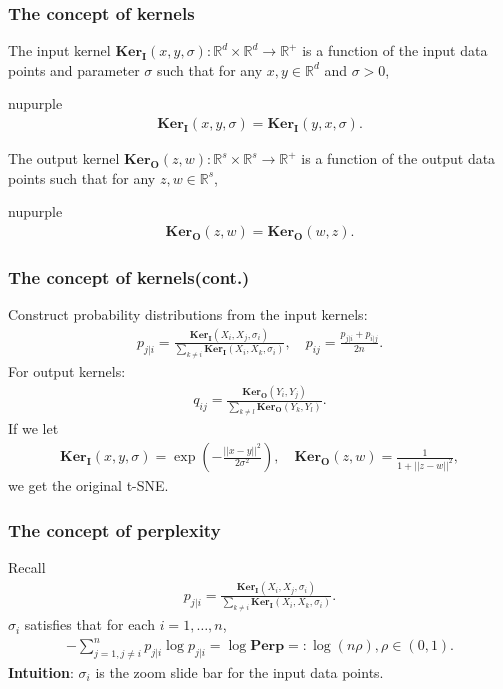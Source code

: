 \documentclass{beamer}
\newcommand{\ki}{\mathbf{Ker}_{\mathbf{I}}}
\newcommand{\ko}{\mathbf{Ker}_{\mathbf{O}}}
\begin{document}
\begin{frame}
  \frametitle{The concept of kernels}
  \begin{definition}  \label{def:input_kernel}
    The input kernel $\ki(x,y,\sigma): \mathbb{R}^d  \times \mathbb{R}^d \to \mathbb{R}^+$ is a function of the input data points and parameter $\sigma$ such that for any $x,y \in \mathbb{R}^d$ and $\sigma > 0$,
    \begin{color}{nupurple}
      \begin{align}
        \ki(x,y,\sigma)=\ki(y,x,\sigma).
      \end{align}
    \end{color}
  \end{definition}
  \begin{definition}  \label{def:output_kernel}
    The output kernel $\ko(z,w):\mathbb{R}^s \times \mathbb{R}^s \to \mathbb{R}^+$ is a function of the output data points such that for any $z,w \in \mathbb{R}^s$,
    \begin{color}{nupurple}
      \begin{align}
        \ko(z,w)=\ko(w,z).
      \end{align}
    \end{color}
  \end{definition}
\end{frame}

\begin{frame}
  \frametitle{The concept of kernels(cont.)}
  Construct probability distributions from the input kernels:
  \begin{align}
    p_{j|i} = \frac{\ki(X_i,X_j,\sigma_i)}{\sum_{k \neq i} \ki(X_i,X_k,\sigma_i)}, \quad p_{ij} = \frac{p_{j|i} + p_{i|j}}{2n}.
  \end{align}
  For output kernels:
  \begin{align}
    q_{ij} = \frac{\ko(Y_i,Y_j)}{\sum_{k \neq l}\ko(Y_k,Y_l)}.
  \end{align}
  If we let
  \begin{align}
    \ki(x,y,\sigma)=\exp\left(-\frac{||x-y||^2}{2\sigma^2}\right), \quad \ko(z,w)=\frac{1}{1+||z-w||^2},
  \end{align}
  we get the original t-SNE.
\end{frame}

\begin{frame}
  \frametitle{The concept of perplexity}
  Recall
  \begin{align}
    p_{j|i} = \frac{\ki(X_i,X_j,\sigma_i)}{\sum_{k \neq i} \ki(X_i,X_k,\sigma_i)}.
  \end{align}
  $\sigma_i$ satisfies that for each $i = 1, \dots, n$,
  \begin{align}
    -\sum_{j = 1, j \neq i}^n p_{j|i} \log p_{j|i} = \log \textbf{Perp} =: \log (n \rho), \rho \in (0,1).
  \end{align}
  \textbf{Intuition}: $\sigma_i$ is the zoom slide bar for the input data points.
\end{frame}
\end{document}
